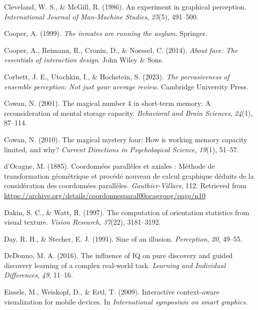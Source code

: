 \documentclass[print]{nuthesis}
\newlength{\cslhangindent}
\newenvironment{CSLReferences}[2]%
{\setlength{\parindent}{0pt}%
\everypar{\setlength{\hangindent}{\cslhangindent}}\ignorespaces}%
{\par}
\begin{document}
\begin{CSLReferences}{1}{0}
\leavevmode{}%
Cleveland, W. S., \& McGill, R. (1986). An experiment in graphical perception. \emph{International Journal of Man-Machine Studies}, \emph{25}(5), 491--500.

\leavevmode{}%
Cooper, A. (1999). \emph{The inmates are running the asylum}. Springer.

\leavevmode{}%
Cooper, A., Reimann, R., Cronin, D., \& Noessel, C. (2014). \emph{About face: The essentials of interaction design}. John Wiley \& Sons.

\leavevmode{}%
Corbett, J. E., Utochkin, I., \& Hochstein, S. (2023). \emph{The pervasiveness of ensemble perception: Not just your average review}. Cambridge University Press.

\leavevmode{}%
Cowan, N. (2001). The magical number 4 in short-term memory: A reconsideration of mental storage capacity. \emph{Behavioral and Brain Sciences}, \emph{24}(1), 87--114.

\leavevmode{}%
Cowan, N. (2010). The magical mystery four: How is working memory capacity limited, and why? \emph{Current Directions in Psychological Science}, \emph{19}(1), 51--57.

\leavevmode{}%
d'Ocagne, M. (1885). {Coordonnées parallèles et axiales : Méthode de transformation géométrique et procédé nouveau de calcul graphique déduits de la considération des coordonnées parallèles}. \emph{Gauthier-Villars}, 112. Retrieved from \url{https://archive.org/details/coordonnesparal00ocaggoog/page/n10}

\leavevmode{}%
Dakin, S. C., \& Watt, R. (1997). The computation of orientation statistics from visual texture. \emph{Vision Research}, \emph{37}(22), 3181--3192.

\leavevmode{}%
Day, R. H., \& Stecher, E. J. (1991). Sine of an illusion. \emph{Perception}, \emph{20}, 49--55.

\leavevmode{}%
DeDonno, M. A. (2016). The influence of IQ on pure discovery and guided discovery learning of a complex real-world task. \emph{Learning and Individual Differences}, \emph{49}, 11--16.

\leavevmode{}%
Eissele, M., Weiskopf, D., \& Ertl, T. (2009). Interactive context-aware visualization for mobile devices. In \emph{International symposium on smart graphics}.


\end{CSLReferences}
\end{document}
